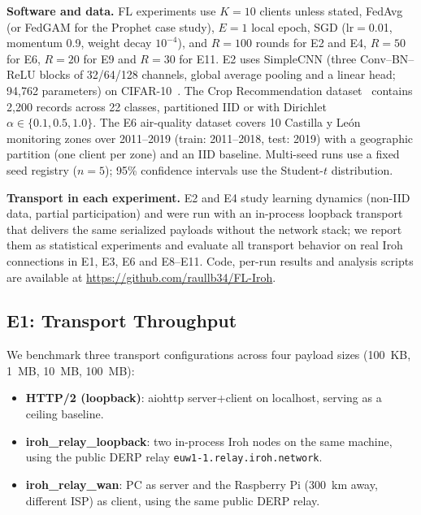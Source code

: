 \textbf{Software and data.} FL experiments use $K{=}10$ clients unless stated, FedAvg (or FedGAM for the Prophet case study), $E{=}1$ local epoch, SGD (lr$=$0.01, momentum 0.9, weight decay $10^{-4}$), and $R{=}100$ rounds for E2 and E4, $R{=}50$ for E6, $R{=}20$ for E9 and $R{=}30$ for E11. E2 uses SimpleCNN (three Conv--BN--ReLU blocks of 32/64/128 channels, global average pooling and a linear head; 94{,}762 parameters) on CIFAR-10~\cite{cifar2009}. The Crop Recommendation dataset~\cite{cropdataset} contains 2{,}200 records across 22 classes, partitioned IID or with Dirichlet $\alpha \in \{0.1, 0.5, 1.0\}$. The E6 air-quality dataset covers 10 Castilla y Le\'on monitoring zones over 2011--2019 (train: 2011--2018, test: 2019) with a geographic partition (one client per zone) and an IID baseline. Multi-seed runs use a fixed seed registry ($n{=}5$); 95\% confidence intervals use the Student-$t$ distribution.

\textbf{Transport in each experiment.} E2 and E4 study learning dynamics (non-IID data, partial participation) and were run with an in-process loopback transport that delivers the same serialized payloads without the network stack; we report them as statistical experiments and evaluate all transport behavior on real Iroh connections in E1, E3, E6 and E8--E11. Code, per-run results and analysis scripts are available at \url{https://github.com/raullb34/FL-Iroh}.

\subsection{E1: Transport Throughput}
\label{sec:e1}

We benchmark three transport configurations across four payload sizes (100~KB, 1~MB, 10~MB, 100~MB):

\begin{itemize}
    \item \textbf{HTTP/2 (loopback)}: aiohttp server+client on localhost, serving as a ceiling baseline.
    \item \textbf{iroh\_relay\_loopback}: two in-process Iroh nodes on the same machine, using the public DERP relay \texttt{euw1-1.relay.iroh.network}.
    \item \textbf{iroh\_relay\_wan}: PC as server and the Raspberry Pi (300~km away, different ISP) as client, using the same public DERP relay.
\end{itemize}

